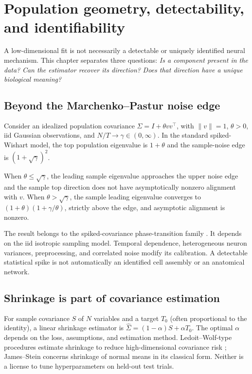 \chapter[Population geometry]{Population geometry, detectability, and identifiability}
\label{ch:population-identifiability}
A low-dimensional fit is not necessarily a detectable or
uniquely identified neural mechanism. This chapter separates
three questions: \emph{Is a component present in the data?}
\emph{Can the estimator recover its direction?}
\emph{Does that direction have a unique biological meaning?}

\section{Beyond the Marchenko--Pastur noise edge}
Consider an idealized population covariance
$\Sigma=I+\theta vv^\top$, with $\|v\|=1$,
$\theta>0$, iid Gaussian observations, and
$N/T\to\gamma\in(0,\infty)$.
In the standard spiked-Wishart model, the top population
eigenvalue is $1+\theta$ and the sample-noise edge is
$(1+\sqrt\gamma)^2$.
\begin{theorem}
When $\theta\le\sqrt\gamma$, the leading sample eigenvalue
approaches the upper noise edge and the sample top direction
does not have asymptotically nonzero alignment with $v$.
When $\theta>\sqrt\gamma$, the sample leading eigenvalue
converges to $(1+\theta)(1+\gamma/\theta)$, strictly above
the edge, and asymptotic alignment is nonzero.
\end{theorem}
The result belongs to the spiked-covariance phase-transition family
\cite{baik2005}. It depends on the iid isotropic sampling model.
Temporal dependence, heterogeneous neuron variances, preprocessing,
and correlated noise modify its calibration.
A detectable statistical spike is not automatically an
identified cell assembly or an anatomical network.

\section{Shrinkage is part of covariance estimation}
For sample covariance $S$ of $N$ variables and a target
$T_0$ (often proportional to the identity), a linear shrinkage
estimator is $\widehat\Sigma=(1-\alpha)S+\alpha T_0$.
The optimal $\alpha$ depends on the loss, assumptions,
and estimation method. Ledoit--Wolf-type procedures estimate
shrinkage to reduce high-dimensional covariance risk
\cite{ledoitwolf2004};
James--Stein concerns shrinkage of normal means in its classical
form. Neither is a license to tune hyperparameters on held-out
test trials.

